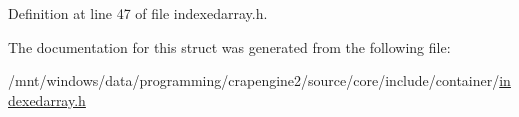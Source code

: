Definition at line 47 of file indexedarray.\+h.



The documentation for this struct was generated from the following file\+:\begin{DoxyCompactItemize}
\item 
/mnt/windows/data/programming/crapengine2/source/core/include/container/\hyperlink{indexedarray_8h}{indexedarray.\+h}\end{DoxyCompactItemize}
